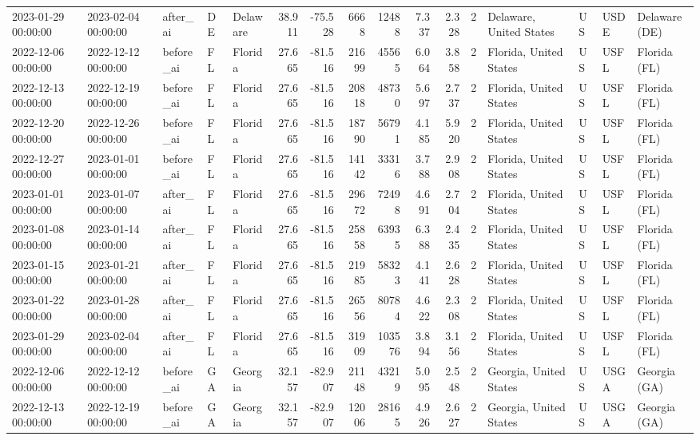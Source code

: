 \begin{tabular}{lllllrrrrrrlllll}
2023-01-29 00:00:00 & 2023-02-04 00:00:00 & after\_ai & DE & Delaware & 38.911 & -75.528 & 6668 & 12488 & 7.337 & 2.328 & 2 & Delaware, United States & US & USDE & Delaware (DE) \\
2022-12-06 00:00:00 & 2022-12-12 00:00:00 & before\_ai & FL & Florida & 27.665 & -81.516 & 21699 & 45565 & 6.064 & 3.858 & 2 & Florida, United States & US & USFL & Florida (FL) \\
2022-12-13 00:00:00 & 2022-12-19 00:00:00 & before\_ai & FL & Florida & 27.665 & -81.516 & 20818 & 48730 & 5.697 & 2.737 & 2 & Florida, United States & US & USFL & Florida (FL) \\
2022-12-20 00:00:00 & 2022-12-26 00:00:00 & before\_ai & FL & Florida & 27.665 & -81.516 & 18790 & 56791 & 4.185 & 5.920 & 2 & Florida, United States & US & USFL & Florida (FL) \\
2022-12-27 00:00:00 & 2023-01-01 00:00:00 & before\_ai & FL & Florida & 27.665 & -81.516 & 14142 & 33316 & 3.788 & 2.908 & 2 & Florida, United States & US & USFL & Florida (FL) \\
2023-01-01 00:00:00 & 2023-01-07 00:00:00 & after\_ai & FL & Florida & 27.665 & -81.516 & 29672 & 72498 & 4.691 & 2.704 & 2 & Florida, United States & US & USFL & Florida (FL) \\
2023-01-08 00:00:00 & 2023-01-14 00:00:00 & after\_ai & FL & Florida & 27.665 & -81.516 & 25858 & 63935 & 6.388 & 2.435 & 2 & Florida, United States & US & USFL & Florida (FL) \\
2023-01-15 00:00:00 & 2023-01-21 00:00:00 & after\_ai & FL & Florida & 27.665 & -81.516 & 21985 & 58323 & 4.141 & 2.628 & 2 & Florida, United States & US & USFL & Florida (FL) \\
2023-01-22 00:00:00 & 2023-01-28 00:00:00 & after\_ai & FL & Florida & 27.665 & -81.516 & 26556 & 80784 & 4.622 & 2.308 & 2 & Florida, United States & US & USFL & Florida (FL) \\
2023-01-29 00:00:00 & 2023-02-04 00:00:00 & after\_ai & FL & Florida & 27.665 & -81.516 & 31909 & 103576 & 3.894 & 3.156 & 2 & Florida, United States & US & USFL & Florida (FL) \\
2022-12-06 00:00:00 & 2022-12-12 00:00:00 & before\_ai & GA & Georgia & 32.157 & -82.907 & 21148 & 43219 & 5.095 & 2.548 & 2 & Georgia, United States & US & USGA & Georgia (GA) \\
2022-12-13 00:00:00 & 2022-12-19 00:00:00 & before\_ai & GA & Georgia & 32.157 & -82.907 & 12006 & 28165 & 4.926 & 2.627 & 2 & Georgia, United States & US & USGA & Georgia (GA) \\

\end{tabular}
